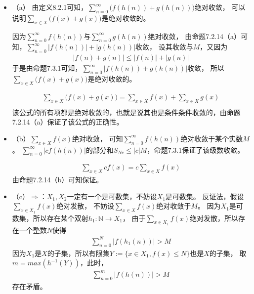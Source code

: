 \documentclass{article}
\begin{document}
\begin{itemize}
  \item （a）
        由定义8.2.1可知，$\sum \limits_{n=0}^\infty \big(f(h(n))+g(h(n))\big)$绝对收敛，
        可以说明$\sum \limits_{x \in X} \big(f(x)+g(x)\big)$是绝对收敛的。

        因为$\sum \limits_{n=0}^\infty f(h(n))$与$\sum \limits_{n=0}^\infty g(h(n))$绝对收敛，
        由命题7.2.14（a）可知，$\sum \limits_{n=0}^\infty |f(h(n))|+|g(h(n))|$收敛，
        设其收敛与$M$，又因为
        \begin{align*}
          |f(n) + g(n)| \leq |f(n)| + |g(n)|
        \end{align*}
        于是由命题7.3.1可知，$\sum \limits_{n=0}^\infty |f(h(n))+g(h(n))|$收敛，
        所以$\sum \limits_{x \in X} \big(f(x)+g(x)\big)$是绝对收敛的。

        \begin{align*}
          \sum \limits_{x \in X} \big(f(x)+g(x)\big) = \sum \limits_{x \in X} f(x) + \sum \limits_{x \in X} g(x) \\
        \end{align*}
        该公式的所有项都是绝对收敛的，也就是说其也是条件条件收敛的，由命题7.2.14（a）保证了该公式的正确性。
  \item （b）$\sum \limits_{x \in X} f(x)$绝对收敛，
        可知$\sum \limits_{n=0}^\infty f(h(n))$绝对收敛于某个实数$M$。
        $\sum \limits_{n=0}^\infty |cf(h(n))|$的部分和$S_{Nc} \leq |c|M$，命题7.3.1保证了该级数收敛。

        \begin{align*}
          \sum \limits_{x \in X} cf(x) = c \sum \limits_{x \in X} f(x)
        \end{align*}
        由命题7.2.14（b）可知保证。

  \item （c）$\Rightarrow$：$X_1,X_2$一定有一个是可数集，不妨设$X_1$是可数集。
        反证法，假设$\sum \limits_{x \in X_{1}} f(x)$绝对发散，
        不妨设$\sum \limits_{x \in X} f(x)$绝对收敛于$M$。
        因为$X_1$是可数集，所以存在某个双射$h_1: \mathbb{N} \rightarrow X_1$，
        由于$\sum \limits_{x \in X_{1}} f(x)$绝对发散，所以存在一个整数$N$使得
        \begin{align*}
          \sum \limits_{n=0}^N |f(h_1(n))| > M
        \end{align*}
        因为$X_1$是$X$的子集，所以有限集$Y := \{x \in X_1, f(x) \leq N\}$也是$X$的子集，
        取$m = max(h^{-1}(Y))$，此时，
        \begin{align*}
          \sum \limits_{n=0}^m |f(h(n))| > M
        \end{align*}
        存在矛盾。


\end{itemize}
\end{document}
